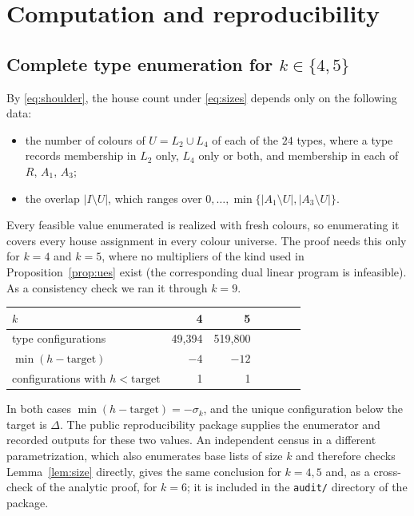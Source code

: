 \documentclass[11pt]{amsart}
\theoremstyle{definition}
\theoremstyle{remark}
\newcommand{\1}{\mathbf 1}
\begin{document}
\section{Computation and reproducibility}\label{sec:computation}

\subsection{\texorpdfstring{Complete type enumeration for $k\in\{4,5\}$}{Complete type enumeration for k=4,5}}
By \eqref{eq:shoulder}, the house count under \eqref{eq:sizes} depends only on
the following data:
\begin{itemize}
\item the number of colours of $U=L_2\cup L_4$ of each of the $24$ types, where a type records
  membership in $L_2$ only, $L_4$ only or both, and membership in each of $R$, $A_1$, $A_3$;
\item the overlap $|I\setminus U|$, which ranges over $0,\dots,\min\{|A_1\setminus U|,|A_3\setminus U|\}$.
\end{itemize}
Every feasible value enumerated is realized with fresh colours, so enumerating it covers every house
assignment in every colour universe. The proof needs this only for $k=4$ and $k=5$, where no multipliers of the kind used in
Proposition~\ref{prop:ues} exist (the corresponding dual linear program is infeasible). As a consistency check we ran it through
$k=9$.

\begin{center}\small
\begin{tabular}{@{}lrrrrrr@{}}
\toprule
$k$ & 4 & 5\\
\midrule
type configurations & 49{,}394 & 519{,}800\\
$\min(h-\mathrm{target})$ & $-4$ & $-12$\\
configurations with $h<\mathrm{target}$ & 1 & 1\\
\bottomrule
\end{tabular}
\end{center}

In both cases $\min(h-\mathrm{target})=-\sigma_k$, and the unique configuration below the target is
$\Delta$. The public reproducibility package supplies the enumerator and recorded outputs for these two
values. An independent census in a different parametrization, which also enumerates base lists of size
$k$ and therefore checks Lemma~\ref{lem:size} directly, gives the same conclusion for $k=4,5$ and, as a
cross-check of the analytic proof, for $k=6$; it is included in the \texttt{audit/} directory of the
package.
\end{document}
